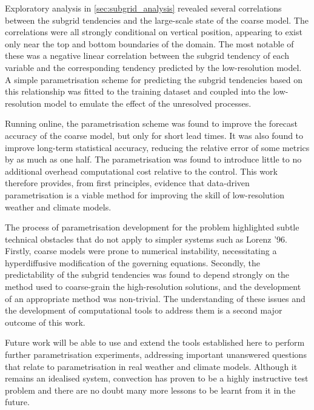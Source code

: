 \documentclass[../main.tex]{subfiles}
\begin{document}
Exploratory analysis in \cref{sec:subgrid_analysis} revealed several
correlations between the subgrid tendencies and the large-scale state of the
coarse model. The correlations were all strongly conditional on vertical
position, appearing to exist only near the top and bottom boundaries of the
domain. The most notable of these was a negative linear correlation between the
subgrid tendency of each variable and the corresponding tendency predicted by
the low-resolution model. A simple parametrisation scheme for predicting the
subgrid tendencies based on this relationship was fitted to the training
dataset and coupled into the low-resolution model to emulate the effect of the
unresolved processes.

Running online, the parametrisation scheme was found to improve the forecast
accuracy of the coarse model, but only for short lead times. It was also found
to improve long-term statistical accuracy, reducing the relative error of some
metrics by as much as one half. The parametrisation was found to introduce
little to no additional overhead computational cost relative to the control.
This work therefore provides, from first principles, evidence that data-driven
parametrisation is a viable method for improving the skill of low-resolution
weather and climate models.

The process of parametrisation development for the \rb{} problem highlighted
subtle technical obstacles that do not apply to simpler systems such as Lorenz
'96. Firstly, coarse models were prone to numerical instability, necessitating
a hyperdiffusive modification of the governing equations. Secondly, the
predictability of the subgrid tendencies was found to depend strongly on the
method used to coarse-grain the high-resolution solutions, and the development
of an appropriate method was non-trivial. The understanding of these issues
and the development of computational tools to address them is a second major
outcome of this work.

Future work will be able to use and extend the tools established here to
perform further parametrisation experiments, addressing important
unanswered questions that relate to parametrisation in real weather and climate
models. Although it remains an idealised system, \rb{} convection has proven to
be a highly instructive test problem and there are no doubt many more lessons
to be learnt from it in the future.


\ifSubfilesClassLoaded{%
    \emergencystretch=5em
    \printbibliography{}
}{}
\end{document}
